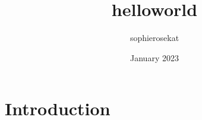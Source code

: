 \documentclass{article}
\title{helloworld}
\author{sophierosekat }
\date{January 2023}
\begin{document}
\maketitle

\section{Introduction}
\end{document}
